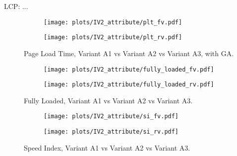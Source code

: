 LCP: ...



\begin{figure}
	\centering
	\begin{subfigure}{.5\textwidth}
		\centering
		\texttt{[image: plots/IV2\_attribute/plt\_fv.pdf]}
		\label{fig:sub1}
	\end{subfigure}%
	\begin{subfigure}{.5\textwidth}
		\centering
		\texttt{[image: plots/IV2\_attribute/plt\_rv.pdf]}
		\label{fig:sub2}
	\end{subfigure}
	\caption{Page Load Time, Variant A1 vs Variant A2 vs Variant A3, with GA.}
	\label{figure:plt_original_test}
\end{figure}


\begin{figure}
	\centering
	\begin{subfigure}{.5\textwidth}
		\centering
		\texttt{[image: plots/IV2\_attribute/fully\_loaded\_fv.pdf]}
		\label{fig:sub1}
	\end{subfigure}%
	\begin{subfigure}{.5\textwidth}
		\centering
		\texttt{[image: plots/IV2\_attribute/fully\_loaded\_rv.pdf]}
		\label{fig:sub2}
	\end{subfigure}
	\caption{Fully Loaded, Variant A1 vs Variant A2 vs Variant A3.}
	\label{figure:plt_original_test}
\end{figure}



\begin{figure}
	\centering
	\begin{subfigure}{.5\textwidth}
		\centering
		\texttt{[image: plots/IV2\_attribute/si\_fv.pdf]}
		\label{fig:sub1}
	\end{subfigure}%
	\begin{subfigure}{.5\textwidth}
		\centering
		\texttt{[image: plots/IV2\_attribute/si\_rv.pdf]}
		\label{fig:sub2}
	\end{subfigure}
	\caption{Speed Index, Variant A1 vs Variant A2 vs Variant A3.}
	\label{figure:plt_original_test}
\end{figure}

